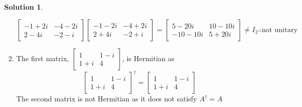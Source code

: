 \documentclass[10pt]{article}
\theoremstyle{definition}
\newtheorem{soln}{Solution}
\begin{document}
\begin{soln}
\begin{enumerate}[label=(\alph*)]
$$\begin{bmatrix}
              -1+2i & -4-2i \\
              2-4i  & -2-i
            \end{bmatrix}\begin{bmatrix}
              -1-2i & -4+2i \\
              2+4i  & -2+i
            \end{bmatrix}=
            \begin{bmatrix}
              5-20i   & 10-10i \\
              -10-10i & 5+20i
            \end{bmatrix}\neq I_2 \therefore \text{not unitary}
          $$
    \item The first matrix, $\begin{bmatrix}
      1   & 1-i \\
      1+i & 4
    \end{bmatrix}$, is Hermitian as $$\begin{bmatrix}
      1   & 1-i \\
      1+i & 4
    \end{bmatrix}^\dagger=\begin{bmatrix}
      1   & 1-i  \\
      1+i & 4
    \end{bmatrix}$$
    The second matrix is not Hermitian as it does not satisfy $A^\dagger=A$
  \end{enumerate}
\end{soln}
\end{document}

